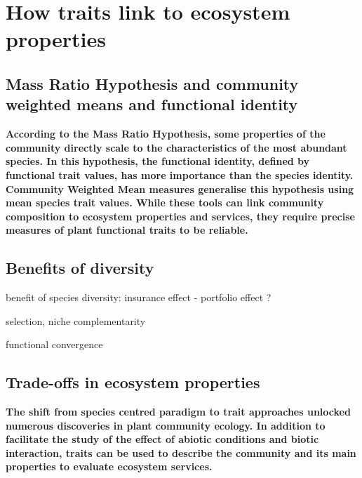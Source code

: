 \section{How traits link to ecosystem properties}

\subsection{Mass Ratio Hypothesis and community weighted means and functional identity}

\textbf{According to the Mass Ratio Hypothesis, some properties of the community directly scale to the characteristics of the most abundant species. In this hypothesis, the functional identity, defined by functional trait values, has more importance than the species identity. Community Weighted Mean measures generalise this hypothesis using mean species trait values. While these tools can link community composition to ecosystem properties and services, they require precise measures of plant functional traits to be reliable.}

\subsection{Benefits of diversity}

benefit of species diversity: insurance effect - portfolio effect ?

selection, niche complementarity

functional convergence

\textbf{}

\subsection{Trade-offs in ecosystem properties}




\textbf{The shift from species centred paradigm to trait approaches unlocked numerous discoveries in plant community ecology. In addition to facilitate the study of the effect of abiotic conditions and biotic interaction, traits can be used to describe the community and its main properties to evaluate ecosystem services.}

